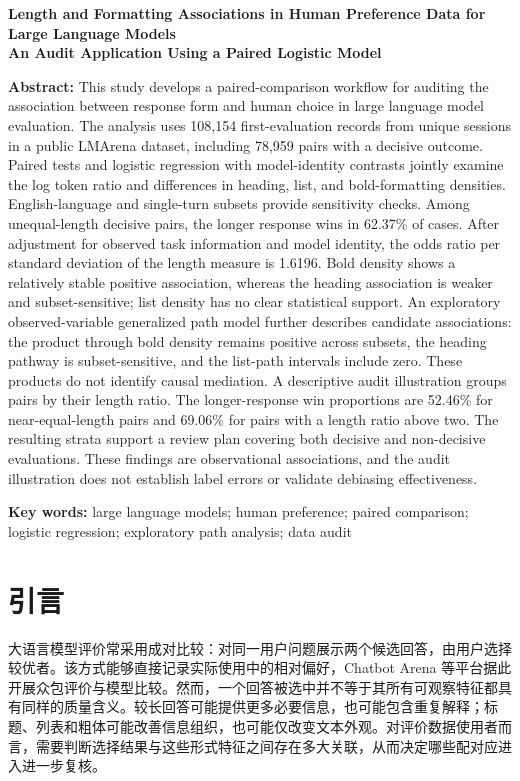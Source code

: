 \documentclass[UTF8,11pt,a4paper,fontset=windows]{ctexart}
\numberwithin{equation}{section}
\begin{document}
\begin{center}
\large\bfseries Length and Formatting Associations in Human Preference Data for Large Language Models\\[0.3em]
\normalsize An Audit Application Using a Paired Logistic Model
\end{center}
\noindent\textbf{Abstract:} This study develops a paired-comparison workflow for auditing the association between response form and human choice in large language model evaluation. The analysis uses 108,154 first-evaluation records from unique sessions in a public LMArena dataset, including 78,959 pairs with a decisive outcome. Paired tests and logistic regression with model-identity contrasts jointly examine the log token ratio and differences in heading, list, and bold-formatting densities. English-language and single-turn subsets provide sensitivity checks. Among unequal-length decisive pairs, the longer response wins in 62.37\% of cases. After adjustment for observed task information and model identity, the odds ratio per standard deviation of the length measure is 1.6196. Bold density shows a relatively stable positive association, whereas the heading association is weaker and subset-sensitive; list density has no clear statistical support. An exploratory observed-variable generalized path model further describes candidate associations: the product through bold density remains positive across subsets, the heading pathway is subset-sensitive, and the list-path intervals include zero. These products do not identify causal mediation. A descriptive audit illustration groups pairs by their length ratio. The longer-response win proportions are 52.46\% for near-equal-length pairs and 69.06\% for pairs with a length ratio above two. The resulting strata support a review plan covering both decisive and non-decisive evaluations. These findings are observational associations, and the audit illustration does not establish label errors or validate debiasing effectiveness.

\noindent\textbf{Key words:} large language models; human preference; paired comparison; logistic regression; exploratory path analysis; data audit

\section{引言}
大语言模型评价常采用成对比较：对同一用户问题展示两个候选回答，由用户选择较优者。该方式能够直接记录实际使用中的相对偏好，Chatbot Arena 等平台据此开展众包评价与模型比较\cite{chiang}。然而，一个回答被选中并不等于其所有可观察特征都具有同样的质量含义。较长回答可能提供更多必要信息，也可能包含重复解释；标题、列表和粗体可能改善信息组织，也可能仅改变文本外观。对评价数据使用者而言，需要判断选择结果与这些形式特征之间存在多大关联，从而决定哪些配对应进入进一步复核。
\end{document}
